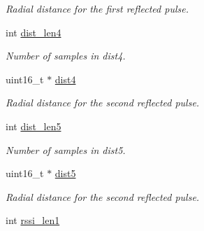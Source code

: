 \begin{DoxyCompactItemize}
\begin{DoxyCompactList}\small\item\em Radial distance for the first reflected pulse. \end{DoxyCompactList}\item 
\hypertarget{structpacpus_1_1__scanData_a8d40370fab5a8cfb99053652a7b84481}{int \hyperlink{structpacpus_1_1__scanData_a8d40370fab5a8cfb99053652a7b84481}{dist\-\_\-len4}}\label{structpacpus_1_1__scanData_a8d40370fab5a8cfb99053652a7b84481}

\begin{DoxyCompactList}\small\item\em Number of samples in dist4. \end{DoxyCompactList}\item 
\hypertarget{structpacpus_1_1__scanData_abc2ba64221bbb94827309530e6435693}{uint16\-\_\-t $\ast$ \hyperlink{structpacpus_1_1__scanData_abc2ba64221bbb94827309530e6435693}{dist4}}\label{structpacpus_1_1__scanData_abc2ba64221bbb94827309530e6435693}

\begin{DoxyCompactList}\small\item\em Radial distance for the second reflected pulse. \end{DoxyCompactList}\item 
\hypertarget{structpacpus_1_1__scanData_a6cea2efd15ad4d1ce9ad66f376456047}{int \hyperlink{structpacpus_1_1__scanData_a6cea2efd15ad4d1ce9ad66f376456047}{dist\-\_\-len5}}\label{structpacpus_1_1__scanData_a6cea2efd15ad4d1ce9ad66f376456047}

\begin{DoxyCompactList}\small\item\em Number of samples in dist5. \end{DoxyCompactList}\item 
\hypertarget{structpacpus_1_1__scanData_aa9b6642d66970a75d3dc9ead6bcd5d21}{uint16\-\_\-t $\ast$ \hyperlink{structpacpus_1_1__scanData_aa9b6642d66970a75d3dc9ead6bcd5d21}{dist5}}\label{structpacpus_1_1__scanData_aa9b6642d66970a75d3dc9ead6bcd5d21}

\begin{DoxyCompactList}\small\item\em Radial distance for the second reflected pulse. \end{DoxyCompactList}\item 
\hypertarget{structpacpus_1_1__scanData_a591990745500fe25d8cec5ea1ece722a}{int \hyperlink{structpacpus_1_1__scanData_a591990745500fe25d8cec5ea1ece722a}{rssi\-\_\-len1}}\label{structpacpus_1_1__scanData_a591990745500fe25d8cec5ea1ece722a}


\end{DoxyCompactItemize}
